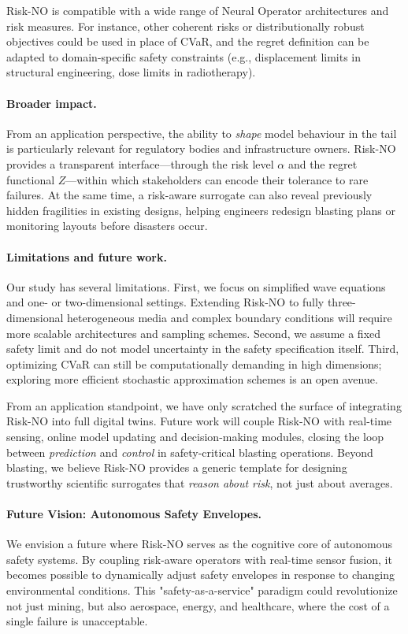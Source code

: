 \documentclass{article}
\theoremstyle{plain}
\theoremstyle{definition}
\theoremstyle{remark}
\begin{document}
Risk-NO is compatible with a wide range of Neural Operator architectures and risk measures. For instance, other coherent risks or distributionally robust objectives \cite{duchi2021learning} could be used in place of CVaR, and the regret definition can be adapted to domain-specific safety constraints (e.g., displacement limits in structural engineering, dose limits in radiotherapy).

\paragraph{Broader impact.}
From an application perspective, the ability to \emph{shape} model behaviour in the tail is particularly relevant for regulatory bodies and infrastructure owners. Risk-NO provides a transparent interface---through the risk level $\alpha$ and the regret functional $Z$---within which stakeholders can encode their tolerance to rare failures. At the same time, a risk-aware surrogate can also reveal previously hidden fragilities in existing designs, helping engineers redesign blasting plans or monitoring layouts before disasters occur.

\paragraph{Limitations and future work.}
Our study has several limitations. First, we focus on simplified wave equations and one- or two-dimensional settings. Extending Risk-NO to fully three-dimensional heterogeneous media and complex boundary conditions will require more scalable architectures and sampling schemes. Second, we assume a fixed safety limit and do not model uncertainty in the safety specification itself. Third, optimizing CVaR can still be computationally demanding in high dimensions; exploring more efficient stochastic approximation schemes is an open avenue.

From an application standpoint, we have only scratched the surface of integrating Risk-NO into full digital twins. Future work will couple Risk-NO with real-time sensing, online model updating and decision-making modules, closing the loop between \emph{prediction} and \emph{control} in safety-critical blasting operations. Beyond blasting, we believe Risk-NO provides a generic template for designing trustworthy scientific surrogates that \emph{reason about risk}, not just about averages.

\paragraph{Future Vision: Autonomous Safety Envelopes.}
We envision a future where Risk-NO serves as the cognitive core of autonomous safety systems. By coupling risk-aware operators with real-time sensor fusion, it becomes possible to dynamically adjust safety envelopes in response to changing environmental conditions. This "safety-as-a-service" paradigm could revolutionize not just mining, but also aerospace, energy, and healthcare, where the cost of a single failure is unacceptable.
\end{document}

